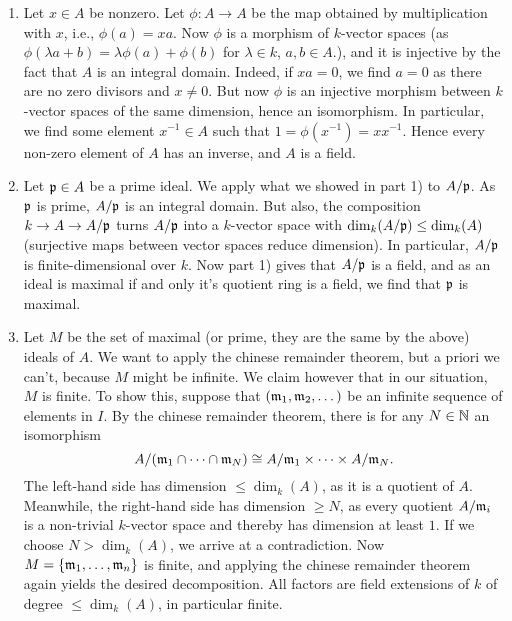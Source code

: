\documentclass[a4paper,11pt]{article}
\begin{document}
\begin{enumerate}
    \item Let $x \in A$ be nonzero. Let $\phi: A \to A$ be the map obtained by 
        multiplication with $x$, i.e., $\phi(a) = x a$. Now $\phi$ is a morphism
        of $k$-vector spaces (as $\phi(\lambda a + b) = \lambda \phi(a) + \phi(b)$
        for $\lambda \in k$, $a,b \in A$.), and it is injective by the fact that 
        $A$ is an integral domain. Indeed, if $xa = 0$, we find $a = 0$ as there
        are no zero divisors and $x \neq 0$. But now $\phi$ is an injective morphism
        between $k$-vector spaces of the same dimension, hence an isomorphism.
        In particular, we find some element $x^{-1} \in A$ such that 
        $1 = \phi(x^{-1}) = x x^{-1}$. Hence every non-zero element of $A$ has an
        inverse, and $A$ is a field.
    \item Let $\mathfrak{p} \in A$ be a prime ideal. We apply what we showed in part 1)
        to $A/\mathfrak{p}$. As $\mathfrak{p}$ is prime, $A/\mathfrak{p}$ is an integral domain. But also,
        the composition $k \to A \to A/ \mathfrak{p}$ turns $A/\mathfrak{p}$ into a $k$-vector space
        with $\dim_k(A/\mathfrak{p}) \leq \dim_k(A)$ (surjective maps between vector spaces
        reduce dimension). In particular, $A/\mathfrak{p}$ is finite-dimensional over
        $k$. Now part 1) gives that $A/\mathfrak{p}$ is a field, and as an ideal is 
        maximal if and only it's quotient ring is a field, we find that 
        $\mathfrak{p}$ is maximal. 
    \item Let $M$ be the set of maximal (or prime, they are the same by the
        above) ideals of $A$. We want to apply the chinese remainder theorem,
        but a priori we can't, because $M$ might be infinite. We claim however
        that in our situation, $M$ is finite. To show this, suppose
        that $(\mathfrak{m}_1, \mathfrak{m}_2, \dots)$ be an infinite sequence of elements in
        $I$. By the chinese remainder theorem, there is for any $N \in \mathbb{N}$ an
        isomorphism
        \begin{equation*}
            A/(\mathfrak{m}_1\cap \dots \cap \mathfrak{m}_N) \cong A/\mathfrak{m}_1 \times \dots \times A/\mathfrak{m}_N.
        \end{equation*}
        The left-hand side has dimension $\leq \dim_k(A)$, as it is a quotient
        of $A$. Meanwhile, the right-hand side has dimension $\geq N$, as 
        every quotient $A/\mathfrak{m}_i$ is a non-trivial $k$-vector space and thereby
        has dimension at least $1$. If we choose $N > \dim_k(A)$, we arrive 
        at a contradiction. Now $M = \{\mathfrak{m}_1, \dots, \mathfrak{m}_n\}$ is finite, and applying
        the chinese remainder theorem again yields the desired decomposition. 
        All factors are field extensions of $k$ of degree $\leq \dim_k(A)$, in
        particular finite.
\end{enumerate}


\contactend
\end{document}
